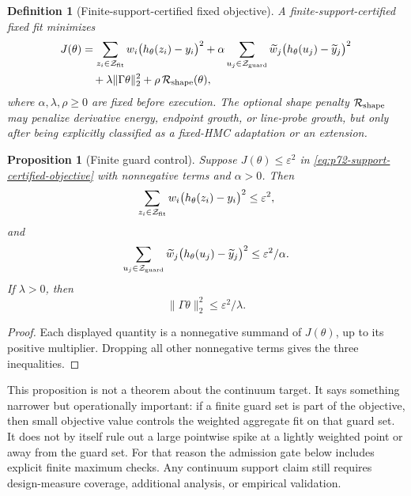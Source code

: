 \documentclass[11pt]{article}
\newtheorem{proposition}{Proposition}
\newtheorem{definition}{Definition}
\newcommand{\calZ}{\mathcal Z}
\begin{document}
\begin{definition}[Finite-support-certified fixed objective]
\label{def:p72-support-certified-objective}
A finite-support-certified fixed fit minimizes
\begin{equation}
\begin{aligned}
    J(\theta)
    &=
    \sum_{z_i\in\calZ_{\rm fit}}
    w_i\bigl(h_\theta(z_i)-y_i\bigr)^2
    +
    \alpha
    \sum_{u_j\in\calZ_{\rm guard}}
    \widetilde w_j\bigl(h_\theta(u_j)-\widetilde y_j\bigr)^2  \\
    &\quad
    +
    \lambda\|\Gamma\theta\|_2^2
    +
    \rho\,\mathcal R_{\rm shape}(\theta),
\end{aligned}
    \label{eq:p72-support-certified-objective}
\end{equation}
where \(\alpha,\lambda,\rho\ge0\) are fixed before execution.  The optional
shape penalty \(\mathcal R_{\rm shape}\) may penalize derivative energy,
endpoint growth, or line-probe growth, but only after being explicitly
classified as a fixed-HMC adaptation or an extension.
\end{definition}

\begin{proposition}[Finite guard control]
\label{prop:p72-guard-control}
Suppose \(J(\theta)\le \varepsilon^2\) in
\eqref{eq:p72-support-certified-objective} with nonnegative terms and
\(\alpha>0\).  Then
\[
    \sum_{z_i\in\calZ_{\rm fit}}
    w_i\bigl(h_\theta(z_i)-y_i\bigr)^2
    \le \varepsilon^2,
\]
and
\[
    \sum_{u_j\in\calZ_{\rm guard}}
    \widetilde w_j\bigl(h_\theta(u_j)-\widetilde y_j\bigr)^2
    \le \varepsilon^2/\alpha .
\]
If \(\lambda>0\), then
\[
    \|\Gamma\theta\|_2^2\le \varepsilon^2/\lambda .
\]
\end{proposition}

\begin{proof}
Each displayed quantity is a nonnegative summand of \(J(\theta)\), up to its
positive multiplier.  Dropping all other nonnegative terms gives the three
inequalities.
\end{proof}

This proposition is not a theorem about the continuum target.  It says
something narrower but operationally important: if a finite guard set is part
of the objective, then small objective value controls the weighted aggregate
fit on that guard set.  It does not by itself rule out a large pointwise spike
at a lightly weighted point or away from the guard set.  For that reason the
admission gate below includes explicit finite maximum checks.  Any continuum
support claim still requires design-measure coverage, additional analysis, or
empirical validation.
\end{document}
